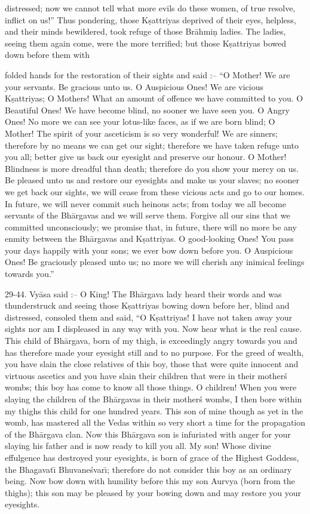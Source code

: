 distressed; now we cannot tell what more evils do these women, of true resolve, inflict on us!'' Thus pondering, those K\d{s}attriyas
deprived of their eyes, helpless, and their minds bewildered, took refuge of those Br\=ahmi\d{n} ladies. The ladies, seeing them again come, were the more terrified; but those K\d{s}attriyas bowed down before them with

folded hands for the restoration of their sights and said :-- ``O Mother! We are your servants. Be gracious unto us. O Auspicious Ones! We are vicious K\d{s}attriyas; O Mothers! What an amount of offence we have committed to you. O Beautiful Ones! We have become blind, no sooner we have seen you. O Angry Ones! No more we can see your lotus-like faces, as if we are born blind; O Mother! The spirit of your asceticism is so very wonderful! We are sinners; therefore by no means we can get our sight; therefore we have taken refuge unto you all; better give us back our eyesight and preserve our honour. O Mother! Blindness is more dreadful than death; therefore do you show your mercy on us. Be pleased unto us and restore our eyesights and make us your slaves; no sooner we get back our sights, we will cease from these vicious acts and go to our homes. In future, we will never commit such heinous acts; from today we all become servants of the Bh\=argavas and we will serve them. Forgive all our sins that we committed unconsciously; we promise that, in future, there will no more be any enmity between the Bh\=argavas and K\d{s}attriyas. O good-looking Ones! You pass your days happily with your sons; we ever bow down before you. O Auspicious Ones! Be graciously pleased unto us; no more we will cherish any inimical feelings towards you.''

29-44. Vy\=asa said :-- O King! The Bh\=argava lady heard their words and was thunderstruck and seeing those K\d{s}attriyas bowing down before her, blind and distressed, consoled them and said, ``O K\d{s}attriyas! I have not taken away your sights nor am I displeased in any way with you. Now hear what is the real cause. This child of Bh\=argava, born of my thigh, is exceedingly angry towards you and has therefore made your eyesight still and to no purpose. For the greed of wealth, you have slain the close relatives of this boy, those that were quite innocent and virtuous ascetics and you have slain their children that were in their mother\'s wombs; this boy has come to know all those things. O children! When you were slaying the children of the Bh\=argavas in their mother\'s wombs, I then bore within my thighs this child for one hundred years. This son of mine though as yet in the womb, has mastered all the Vedas within so very short a time for the propagation of the Bh\=argava clan. Now this Bh\=argava son is infuriated with anger for your slaying his father and is now ready to kill you all. My son! Whose divine effulgence has destroyed your eyesights, is born of grace of the Highest Goddess, the Bhagavat\={\i} Bhuvane\'svar\={\i}; therefore do not consider this boy as an ordinary being. Now bow down with humility before this my son Aurvya (born from the thighs); this son may be pleased by your bowing down and may restore you your eyesights.

